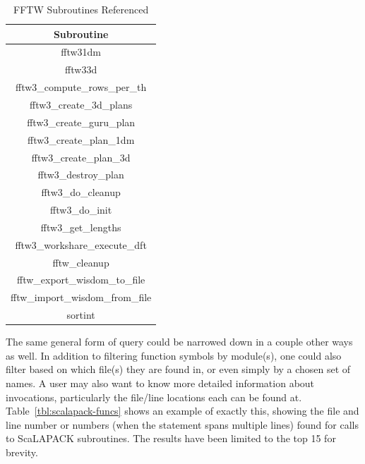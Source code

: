 \begin{table}[htbp]
\caption{FFTW Subroutines Referenced}
\begin{center}
\begin{tabular}{|c|}
\hline
\textbf{Subroutine} \\
\hline
fftw31dm \\
\hline
fftw33d \\
\hline
fftw3\_compute\_rows\_per\_th \\
\hline
fftw3\_create\_3d\_plans \\
\hline
fftw3\_create\_guru\_plan \\
\hline
fftw3\_create\_plan\_1dm \\
\hline
fftw3\_create\_plan\_3d \\
\hline
fftw3\_destroy\_plan \\
\hline
fftw3\_do\_cleanup \\
\hline
fftw3\_do\_init \\
\hline
fftw3\_get\_lengths \\
\hline
fftw3\_workshare\_execute\_dft \\
\hline
fftw\_cleanup \\
\hline
fftw\_export\_wisdom\_to\_file \\
\hline
fftw\_import\_wisdom\_from\_file \\
\hline
sortint \\
\hline
\end{tabular}
\label{tab:fftw-funcs}
\end{center}
\end{table}

The same general form of query could be narrowed down in a couple other ways as well.
In addition to filtering function symbols by module(s), one could also filter based on which file(s) they are found in, or even simply by a chosen set of names.
A user may also want to know more detailed information about invocations, particularly the file/line locations each can be found at.
Table~\ref{tbl:scalapack-funcs} shows an example of exactly this, showing the file and line number or numbers (when the statement spans multiple lines) found for calls to ScaLAPACK subroutines.
The results have been limited to the top 15 for brevity.

